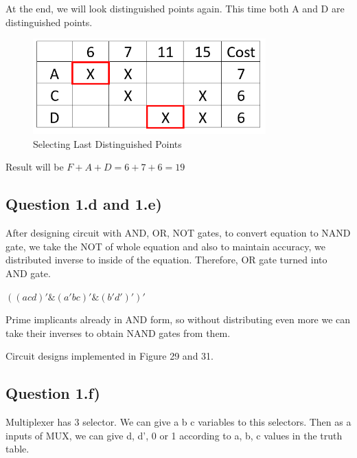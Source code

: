 \documentclass[pdftex,12pt,a4paper]{article}
\begin{document}
At the end, we will look distinguished points again. This time both A and D are distinguished points.

   \begin{figure}[H]
    	\centering
    	\includegraphics[width=0.8\textwidth]{preliminary/last_two_distinguish_points.png}	
    	\caption{Selecting Last Distinguished Points}
    	\label{Selecting Last Distinguished Points}
    \end{figure}

\begin{center}
    Result will be \textbf{$F+A+D=6+7+6=19$}
\end{center}
\subsection{Question 1.d and 1.e)}

After designing circuit with AND, OR, NOT gates, to convert equation to NAND gate, we take the NOT of whole equation and also to maintain accuracy, we distributed inverse to inside of the equation. Therefore, OR gate turned into AND gate. 

\begin{center} $((acd)' \& (a'bc)' \& (b'd')')'$ \end{center}
Prime implicants already in AND form, so without distributing even more we can take their inverses to obtain NAND gates from them.

Circuit designs implemented in Figure 29 and 31.


\subsection{Question 1.f)}

Multiplexer has 3 selector. We can give a b c variables to this selectors. Then as a inputs of MUX, we can give d, d', 0 or 1  according to a, b, c values in the truth table.
\end{document}
